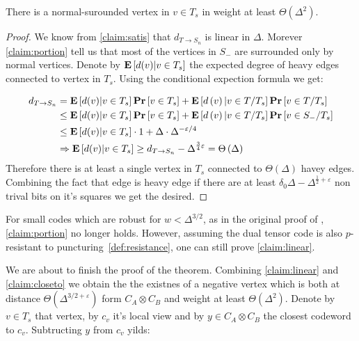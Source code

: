 \begin{claim}
  \label{claim:linear}
  There is a normal-surounded vertex in $v \in T_{s}$ in weight at least $\Theta\left(\Delta^{2}\right)$.   
 \end{claim}
 \begin{proof}
   We know from \cref{claim:satis} that $d_{T\rightarrow S_{n} }$ is linear in $\Delta$. Morever \cref{claim:portion} tell us that most of the vertices in $S_{-}$ are surrounded only by normal vertices. Denote by $\mathbf{E} \left[ { d(v) | v \in T_{s} } \right]$ the expected degree of heavy edges connected to vertex in $T_{s}$. Using the conditional expection formula we get:
  
   \begin{equation*}
     \begin{split}
       d_{T \rightarrow S_{n}} &= \mathbf{E} \left[ { d(v) | v \in T_{s} } \right] \mathbf{Pr} \left[  v \in T_{s} \right] + \mathbf{E} \left[ {d\left( v \right) | v \in T / T_{s}} \right] \mathbf{Pr} \left[  v \in T / T_{s} \right] \\
       & \le \mathbf{E} \left[ { d(v) | v \in T_{s} } \right] \mathbf{Pr} \left[  v \in T_{s} \right] + \mathbf{E} \left[ {d\left( v \right) | v \in T / T_{s}} \right] \mathbf{Pr} \left[  v \in S_{-} / T_{s} \right] \\
       & \le \mathbf{E} \left[ { d(v) | v \in T_{s} } \right] \cdot 1   + \Delta \cdot  \Delta^{-\varepsilon/4} \\
       & \Rightarrow  \mathbf{E} \left[ { d(v) | v \in T_{s} } \right] \ge d_{T \rightarrow S_{n}} - \Delta^{\frac{3}{4} \varepsilon} = \Theta\left( \Delta \right) 
     \end{split}
   \end{equation*}
   Therefore there is at least a single vertex in $T_{s}$ connected to $\Theta\left( \Delta \right)$ havey edges. Combining the fact that edge is heavy edge if there are at least $\delta_{0}\Delta - \Delta^{\frac{1}{2} + \varepsilon}$ non trival bits on it's squares we get the desired.  
 \end{proof}

 \begin{remark}
For small codes which are robust for $w < \Delta^{3/2}$, as in the original proof of \cite{leverrier2022quantum}, \cref{claim:portion} no longer holds. However, assuming the dual tensor code is also $p$-resistant to puncturing~\ref{def:resistance}, one can still prove \cref{claim:linear}.
 \end{remark}

 We are about to finish the proof of the theorem. Combining \cref{claim:linear} and \cref{claim:closeto} we obtain the the existnes of a negative vertex which is both at distance $\Theta\left(\Delta^{3/2 + \varepsilon}\right)$ form $C_{A}\otimes C_{B}$ and weight at least $\Theta\left( \Delta^{2} \right)$. Denote by $v \in T_{s}$ that vertex, by $c_{v}$ it's local view and by $y \in C_{A}\otimes C_{B}$ the closest codeword to $c_{v}$. Subtructing $y$ from $c_{v}$ yilds: 
 
